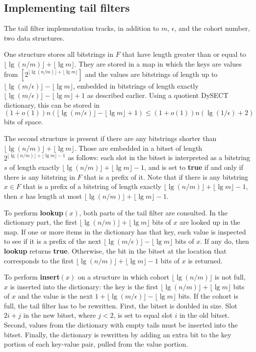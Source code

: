 \documentclass[11pt,letterpaper]{article}
\begin{document}
\subsection{Implementing tail filters}

The tail filter implementation tracks, in addition to $m$, $\epsilon$, and the cohort number, two data structures.

One structure stores all bitstrings in $F$ that have length greater than or equal to $\lfloor \lg (n/m) \rfloor + \lfloor \lg m \rfloor$.
They are stored in a map in which the keys are values from $[2^{\lfloor \lg (n/m) \rfloor + \lfloor \lg m \rfloor}]$ and the values are bitstrings of length up to $\lfloor \lg (m/\epsilon) \rfloor - \lfloor \lg m \rfloor$, embedded in bitstrings of length exactly $\lfloor \lg (m/\epsilon) \rfloor - \lfloor \lg m \rfloor + 1$ as described earlier.
Using a quotient DySECT dictionary, this can be stored in $(1 + o(1))n(\lfloor \lg (m/\epsilon) \rfloor - \lfloor \lg m \rfloor + 1) \leq (1+o(1))n(\lg (1/\epsilon) + 2)$ bits of space.

The second structure is present if there are any bitstrings shorter than $\lfloor \lg (n/m) \rfloor + \lfloor \lg m \rfloor$.
Those are embedded in a bitset of length $2^{\lfloor \lg (n/m) \rfloor + \lfloor \lg m \rfloor - 1}$ as follows:
each slot in the bitset is interpreted as a bitstring $s$ of length exactly $\lfloor \lg (n/m) \rfloor + \lfloor \lg m \rfloor - 1$, and is set to {\bf true} if and only if there is any bitstring in $F$ that is a prefix of it.
Note that if there is any bitstring $x \in F$ that is a prefix of a bitstring of length exactly $\lfloor \lg (n/m) \rfloor + \lfloor \lg m \rfloor - 1$, then $x$ has length at most $\lfloor \lg (n/m) \rfloor + \lfloor \lg m \rfloor - 1$.

To perform {\bf lookup$(x)$}, both parts of the tail filter are consulted.
In the dictionary part, the first $\lfloor \lg (n/m) \rfloor + \lfloor \lg m \rfloor$ bits of $x$ are looked up in the map.
If one or more items in the dictionary has that key, each value is inspected to see if it is a prefix of the next $\lfloor \lg(m/\epsilon) \rfloor - \lfloor \lg m \rfloor$ bits of $x$.
If any do, then {\bf lookup} returns {\bf true}.
Otherwise, the bit in the bitset at the location that corresponds to the first $\lfloor \lg (n/m) \rfloor + \lfloor \lg m \rfloor - 1$ bits of $x$ is returned.

To perform {\bf insert$(x)$} on a structure in which cohort $\lfloor \lg (n/m) \rfloor$ is not full, $x$ is inserted into the dictionary: the key is the first $\lfloor \lg (n/m) \rfloor + \lfloor \lg m \rfloor$ bits of $x$ and the value is the next $1 + \lfloor \lg (m/\epsilon) \rfloor - \lfloor \lg m \rfloor$ bits.
If the cohort is full, the tail filter has to be rewritten.
First, the bitset is doubled in size.
Slot $2i + j$ in the new bitset, where $j < 2$, is set to equal slot $i$ in the old bitset.
Second, values from the dictionary with empty tails must be inserted into the bitset.
Finally, the dictionary is rewritten by adding an extra bit to the key portion of each key-value pair, pulled from the value portion.
\end{document}
